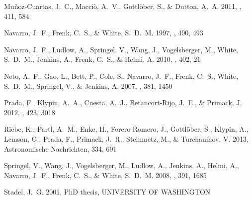 \documentclass{emulateapj}
\begin{document}
\begin{thebibliography}{18}
{Mu{\~n}oz-Cuartas}, J.~C., {Macci{\`o}}, A.~V., {Gottl{\"o}ber}, S., \&
  {Dutton}, A.~A. 2011, \mnras, 411, 584

{Navarro}, J.~F., {Frenk}, C.~S., \& {White}, S.~D.~M. 1997, \apj, 490, 493

{Navarro}, J.~F., {Ludlow}, A., {Springel}, V., {Wang}, J., {Vogelsberger}, M.,
  {White}, S.~D.~M., {Jenkins}, A., {Frenk}, C.~S., \& {Helmi}, A. 2010,
  \mnras, 402, 21

{Neto}, A.~F., {Gao}, L., {Bett}, P., {Cole}, S., {Navarro}, J.~F., {Frenk},
  C.~S., {White}, S.~D.~M., {Springel}, V., \& {Jenkins}, A. 2007, \mnras, 381,
  1450

{Prada}, F., {Klypin}, A.~A., {Cuesta}, A.~J., {Betancort-Rijo}, J.~E., \&
  {Primack}, J. 2012, \mnras, 423, 3018

{Riebe}, K., {Partl}, A.~M., {Enke}, H., {Forero-Romero}, J., {Gottl{\"o}ber},
  S., {Klypin}, A., {Lemson}, G., {Prada}, F., {Primack}, J.~R., {Steinmetz},
  M., \& {Turchaninov}, V. 2013, Astronomische Nachrichten, 334, 691

{Springel}, V., {Wang}, J., {Vogelsberger}, M., {Ludlow}, A., {Jenkins}, A.,
  {Helmi}, A., {Navarro}, J.~F., {Frenk}, C.~S., \& {White}, S.~D.~M. 2008,
  \mnras, 391, 1685

{Stadel}, J.~G. 2001, PhD thesis, UNIVERSITY OF WASHINGTON

\end{thebibliography}
\end{document}
